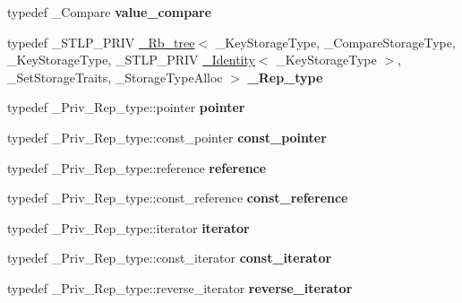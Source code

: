 \begin{DoxyCompactItemize}
\mbox{\label{classset_ad1394c77b0dbf33ace9ee1dda0a93cfb}} 
typedef \+\_\+\+Compare {\bfseries value\+\_\+compare}
\item 
\mbox{\label{classset_a77d5433171339b74b6fbf028c394a728}} 
typedef \+\_\+\+S\+T\+L\+P\+\_\+\+P\+R\+IV \hyperlink{class___rb__tree}{\+\_\+\+Rb\+\_\+tree}$<$ \+\_\+\+Key\+Storage\+Type, \+\_\+\+Compare\+Storage\+Type, \+\_\+\+Key\+Storage\+Type, \+\_\+\+S\+T\+L\+P\+\_\+\+P\+R\+IV \hyperlink{struct___identity}{\+\_\+\+Identity}$<$ \+\_\+\+Key\+Storage\+Type $>$, \+\_\+\+Set\+Storage\+Traits, \+\_\+\+Storage\+Type\+Alloc $>$ {\bfseries \+\_\+\+Rep\+\_\+type}
\item 
\mbox{\label{classset_ac86b6a0842d18d2b5c9820af1aedee76}} 
typedef \+\_\+\+Priv\+\_\+\+Rep\+\_\+type\+::pointer {\bfseries pointer}
\item 
\mbox{\label{classset_aaaba1142ba42325955dd0ed61db6394a}} 
typedef \+\_\+\+Priv\+\_\+\+Rep\+\_\+type\+::const\+\_\+pointer {\bfseries const\+\_\+pointer}
\item 
\mbox{\label{classset_ac8845913cdbf752edbb445db79114dce}} 
typedef \+\_\+\+Priv\+\_\+\+Rep\+\_\+type\+::reference {\bfseries reference}
\item 
\mbox{\label{classset_a2414ce9118f14aa39cf509d01daa583a}} 
typedef \+\_\+\+Priv\+\_\+\+Rep\+\_\+type\+::const\+\_\+reference {\bfseries const\+\_\+reference}
\item 
\mbox{\label{classset_a32dce0a33ac8c98785b4700a6d4a34e0}} 
typedef \+\_\+\+Priv\+\_\+\+Rep\+\_\+type\+::iterator {\bfseries iterator}
\item 
\mbox{\label{classset_a9eb52915589380836909946886a765b9}} 
typedef \+\_\+\+Priv\+\_\+\+Rep\+\_\+type\+::const\+\_\+iterator {\bfseries const\+\_\+iterator}
\item 
\mbox{\label{classset_adcff61f32ddcde14f49cd55debd9201e}} 
typedef \+\_\+\+Priv\+\_\+\+Rep\+\_\+type\+::reverse\+\_\+iterator {\bfseries reverse\+\_\+iterator}
\item 
\mbox{\label{classset_a696878832ba6c4b08f864596cd3c0cc7}} 

\end{DoxyCompactItemize}
